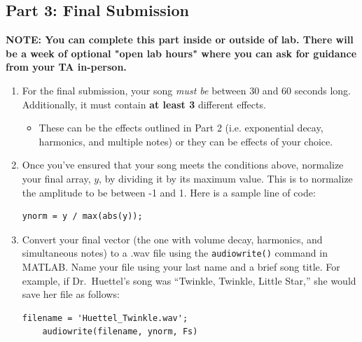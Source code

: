 \documentclass[12pt]{article}
\begin{document}
\subsection{Part 3: Final Submission}
\textbf{NOTE: You can complete this part inside or outside of lab. There will be a week of optional "open lab hours" where you can ask for guidance from your TA in-person.}

\begin{enumerate}
    \item For the final submission, your song \textit{must be} between 30 and 60 seconds long. Additionally, it must contain \textbf{at least 3} different effects. 
    \begin{itemize}
        \item These can be the effects outlined in Part 2 (i.e. exponential decay, harmonics, and multiple notes) or they can be effects of your choice. 
    \end{itemize}

    \item Once you've ensured that your song meets the conditions above, normalize your final array, $y$, by dividing it by its maximum value.  This is to normalize the amplitude to be between -1 and 1.  Here is a sample line of code:
    \begin{lstlisting}[frame=single]
    ynorm = y / max(abs(y));
    \end{lstlisting}
    \item Convert your final vector (the one with volume decay, harmonics, and simultaneous notes) to a .wav file using the \texttt{audiowrite()} command in MATLAB. Name your file using your last name and a brief song title. For example, if Dr.~Huettel's song was ``Twinkle, Twinkle, Little Star,'' she would save her file as follows:
    \begin{lstlisting}[frame=single]
    filename = 'Huettel_Twinkle.wav';
    audiowrite(filename, ynorm, Fs)
    \end{lstlisting}
    
    


\end{enumerate}
\end{document}
